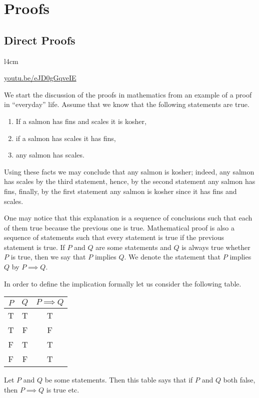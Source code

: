 \chapter{Proofs}
\section{Direct Proofs}
\begin{wrapfigure}{l}{4cm}
  \begin{center}
    \vskip -0.5cm
    \vskip 0.25cm
    \href{https://youtu.be/eJD0gGqveIE}{youtu.be/eJD0gGqveIE}
  \end{center}
  \vskip -1cm
\end{wrapfigure}
We start the discussion of the proofs in mathematics from an example of a proof
in ``everyday'' life. Assume that we know that the following statements are
true.
\begin{enumerate}
  \item If a salmon has fins and scales it is kosher,
  \item if a salmon has scales it has fins,
  \item any salmon has scales.
\end{enumerate}
Using these facts we may conclude that any salmon is kosher; indeed, any salmon
has scales by the third statement, hence, by the second statement any salmon has
fins, finally, by the first statement any salmon is kosher since it has fins and
scales.

One may notice that this explanation is a sequence of conclusions such that
each of them true because the previous one is true.
Mathematical proof is also a sequence of statements such that every statement
is true  if the previous statement is true. If $P$ and $Q$ are some statements
and $Q$ is always true whether $P$ is true, then we say that $P$ implies $Q$.
We denote the statement that $P$ implies $Q$ by $P \implies Q$.

In order to define the implication formally let us consider the following table.
\begin{center}
  \begin{tabular}{ c | c | c }
    $P$ & $Q$ & $P \implies Q$ \\ \hline
    T   & T   & T \\
    T   & F   & F \\
    F   & T   & T \\
    F   & F   & T \\
  \end{tabular}
\end{center}
Let $P$ and $Q$ be some statements. Then this table says that if $P$ and $Q$
both false, then $P \implies Q$ is true etc.

